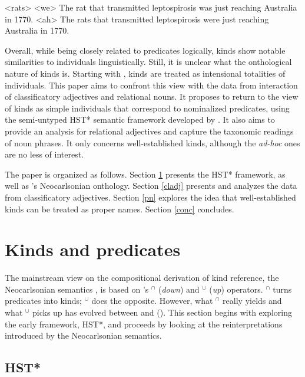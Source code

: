 \documentclass[a4paper, 12pt]{article}
\begin{document}
\pex<rats>
    \a<we> The rat that transmitted leptospirosis was just reaching Australia in 1770.  
    \a<ah> The rats that transmitted leptospirosis were just reaching Australia in 1770.
\xe
        
Overall, while being closely related to predicates logically, kinds show notable similarities to individuals linguistically. Still, it is unclear what the onthological nature of kinds is. Starting with \parencite{chierchia1998referencekindslanguages}, kinds are treated as intensional totalities of individuals. This paper aims to confront this view with the data from interaction of classificatory adjectives and relational nouns. It proposes to return to the view of kinds as simple individuals that correspond to nominalized predicates, using the semi-untyped HST* semantic framework developed by \textcite{cocchiarella1974fregeansemanticsrealist,chierchia1984topicssyntaxsemantics}. It also aims to provide an analysis for relational adjectives and capture the taxonomic readings of noun phrases. It only concerns well-established kinds, although the \textit{ad-hoc} ones are no less of interest.

The paper is organized as follows. Section \ref{chierchia} presents the HST* framework, as well as \textcite{chierchia1998referencekindslanguages}'s Neocarlsonian onthology. Section \ref{cladj} presents and analyzes the data from classificatory adjectives. Section \ref{pn} explores the idea that well-established kinds can be treated as proper names. Section \ref{conc} concludes.

\section{Kinds and predicates}\label{chierchia}

The mainstream view on the compositional derivation of kind reference, the Neocarlsonian semantics \parencite{chierchia1998referencekindslanguages}, is based on \textcite{chierchia1984topicssyntaxsemantics}'s $^\cap $ (\emph{down}) and $^\cup $ (\emph{up}) operators. $^\cap $ turns predicates into kinds; $^\cup $ does the opposite. However, what $^\cap $ really yields and what $^\cup $ picks up has evolved between \parencite{chierchia1984topicssyntaxsemantics} and (\citeyear{chierchia1998referencekindslanguages}). This section begins with exploring the early framework, HST*, and proceeds by looking at the reinterpretations introduced by the Neocarlsonian semantics.

\subsection{HST*}
\end{document}
